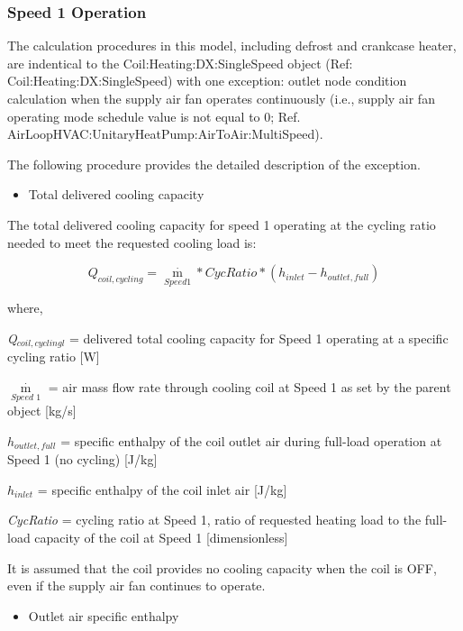 \subsubsection{Speed 1 Operation}\label{speed-1-operation}

The calculation procedures in this model, including defrost and crankcase heater, are indentical to the Coil:Heating:DX:SingleSpeed object (Ref: Coil:Heating:DX:SingleSpeed) with one exception: outlet node condition calculation when the supply air fan operates continuously (i.e., supply air fan operating mode schedule value is not equal to 0; Ref. AirLoopHVAC:UnitaryHeatPump:AirToAir:MultiSpeed).

The following procedure provides the detailed description of the exception.

\begin{itemize}
  \item Total delivered cooling capacity
\end{itemize}

The total delivered cooling capacity for speed 1 operating at the cycling ratio needed to meet the requested cooling load is:

\begin{equation}
{Q_{coil,cycling}} = {\mathop m\limits^\cdot_{Speed1}}*CycRatio*({h_{inlet}} - {h_{outlet,full}})
\end{equation}

where,

\emph{Q\(_{coil,cyclingl}\)} = delivered total cooling capacity for Speed 1 operating at a specific cycling ratio {[}W{]}

\({\mathop m\limits^\cdot_{Speed\,\,1}}\) = air mass flow rate through cooling coil at Speed 1 as set by the parent object {[}kg/s{]}

\(h_{outlet,full}\) = specific enthalpy of the coil outlet air during full-load operation at Speed 1 (no cycling) {[}J/kg{]}

\(h_{inlet}\) = specific enthalpy of the coil inlet air {[}J/kg{]}

\emph{CycRatio} = cycling ratio at Speed 1, ratio of requested heating load to the full-load capacity of the coil at Speed 1 {[}dimensionless{]}

It is assumed that the coil provides no cooling capacity when the coil is OFF, even if the supply air fan continues to operate.

\begin{itemize}
  \item Outlet air specific enthalpy
\end{itemize}

